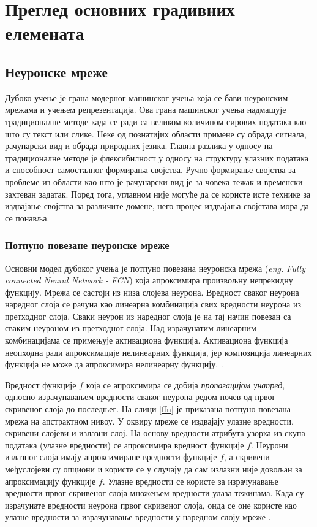 \documentclass[11pt,oneside]{memoir}
\begin{document}
\chapter{Преглед основних градивних елемената}
\label{chp:razrada}

\section{Неуронске мреже}

Дубоко учење је грана модерног машинског учења која се бави неуронским мрежама и учењем репрезентација. 
Ова грана машинског учења надмашује традиционалне методе када се ради са великом количином сирових података
као што су текст или слике. 
Неке од познатијих области примене су обрада сигнала, рачунарски вид и обрада природних језика. 
Главна разлика у односу на традиционалне методе је флексибилност у односу на структуру улазних података и
способност самосталног формирања својства. Ручно формирање својства за проблеме из области као што је рачунарски вид је за човека тежак
и временски захтеван задатак. Поред тога, углавном није могуће да се користе исте технике за издвајање својства за различите домене, него
процес издвајања својстава мора да се понавља.

\subsection{Потпуно повезане неуронске мреже}

Основни модел дубоког учења је потпуно повезана неуронска мрежа (\textit{eng. Fully connected Neural Network - FCN}) која
апроксимира произвољну непрекидну функцију. Мрежа се састоји из
низа слојева неурона. Вредност сваког неурона наредног слоја се рачуна као линеарна комбинација свих вредности неурона из претходног слоја. 
Сваки неурон из наредног слоја је на тај начин повезан са сваким неуроном из претходног слоја. Над израчунатим линеарним комбинацијама се примењује
активациона функција. Активациона функција неопходна ради апроксимације нелинеарних функција, јер композиција линеарних функција не може
да апроксимира нелинеарну функцију.  \cite{deep_learning_goodfellow, ml_mladen}.

Вредност функције $f$ која 
се апроксимира се добија \textit{пропагацијом унапред}, односно израчунавањем вредности сваког неурона редом почев од
првог скривеног слоја до последњег. На слици
\ref{ffn} је приказана потпуно повезана мрежа на апстрактном нивоу.
У оквиру мреже се издвајају улазне вредности, скривени слојеви и излазни слој. На основу
вредности атрибута узорка из скупа података (улазне вредности) се апроксимира вредност функције $f$. Неурони излазног слоја имају апроксимиране вредности функције $f$, а
скривени међуслојеви су опциони и користе се у случају да сам излазни није довољан за апроксимацију функције $f$.
Улазне вредности се користе за израчунавање вредности првог скривеног слоја множењем вредности улаза тежинама. Када су израчунате вредности неурона првог скривеног слоја, онда се оне користе као улазне вредности за израчунавање
вредности у наредном слоју мреже \cite{deep_learning_goodfellow}.
\end{document}
